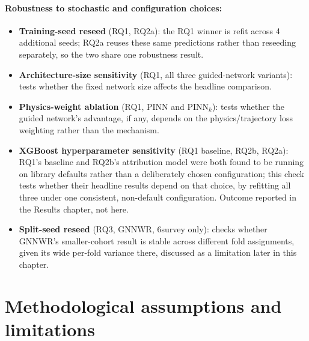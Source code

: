 \paragraph*{Robustness to stochastic and configuration choices:} 
\begin{itemize}
\setlength\itemsep{0pt}
\item \textbf{Training-seed reseed} (RQ1, RQ2a): the RQ1 winner is refit across 4 additional
  seeds; RQ2a reuses these same predictions rather than reseeding separately, so the two share one
  robustness result.
\item \textbf{Architecture-size sensitivity} (RQ1, all three guided-network variants): tests
  whether the fixed network size affects the headline comparison.
\item \textbf{Physics-weight ablation} (RQ1, PINN and PINN$_k$): tests whether the guided
  network's advantage, if any, depends on the physics/trajectory loss weighting rather than the
  mechanism.
\item \textbf{XGBoost hyperparameter sensitivity} (RQ1 baseline, RQ2b, RQ2a): RQ1's baseline and
  RQ2b's attribution model were both found to be running on library defaults rather than a
  deliberately chosen configuration; this check tests whether their headline results depend on
  that choice, by refitting all three under one consistent, non-default configuration. Outcome
  reported in the Results chapter, not here.
\item \textbf{Split-seed reseed} (RQ3, GNNWR, 6survey only): checks whether GNNWR's
  smaller-cohort result is stable across different fold assignments, given its wide per-fold
  variance there, discussed as a limitation later in this chapter.
\end{itemize}


\section{Methodological assumptions and limitations}


